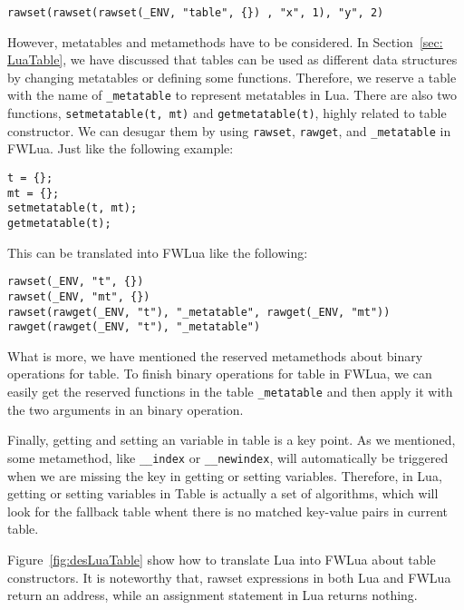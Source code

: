 \begin{verbatim}
rawset(rawset(rawset(_ENV, "table", {}) , "x", 1), "y", 2)
\end{verbatim}

However, metatables and metamethods have to be considered. In Section~\ref{sec: LuaTable}, we have discussed that tables can be used as different data structures by changing metatables or defining some functions. Therefore, we reserve a table with the name of {\tt \_metatable} to represent metatables in Lua. There are also two functions, {\tt setmetatable(t, mt)} and {\tt getmetatable(t)}, highly related to table constructor. We can desugar them by using {\tt rawset}, {\tt rawget}, and {\tt \_metatable} in FWLua. Just like the following example:

\begin{verbatim}
t = {};
mt = {};
setmetatable(t, mt);
getmetatable(t);
\end{verbatim}

This can be translated into FWLua like the following:

\begin{verbatim}
rawset(_ENV, "t", {})
rawset(_ENV, "mt", {})
rawset(rawget(_ENV, "t"), "_metatable", rawget(_ENV, "mt"))
rawget(rawget(_ENV, "t"), "_metatable")
\end{verbatim}


What is more, we have mentioned the reserved metamethods about binary operations for table. To finish binary operations for table in FWLua, we can easily get the reserved functions in the table {\tt \_metatable} and then apply it with the two arguments in an binary operation.

Finally, getting and setting an variable in table is a key point. As we mentioned, some metamethod, like {\tt \_\_index} or {\tt \_\_newindex}, will automatically be triggered when we are missing the key in getting or setting variables. Therefore, in Lua, getting or setting variables in Table is actually a set of algorithms, which will look for the fallback table whent there is no matched key-value pairs in current table.


Figure~\ref{fig:desLuaTable} show how to translate Lua into FWLua about table constructors. It is noteworthy that, rawset expressions in both Lua and FWLua return an address, while an assignment statement in Lua returns nothing.

